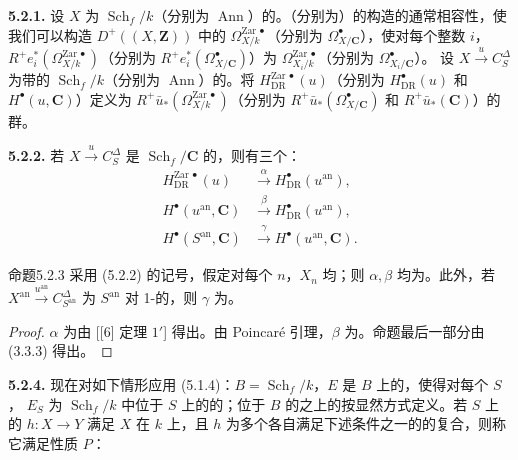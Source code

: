 \textbf{5.2.1.} 设 $X$ 为 $\operatorname{Sch}_f/k$（分别为 $\operatorname{Ann}$）的。（分别为）的构造的通常相容性，使我们可以构造 $D^+((X,\mathbf Z))$ 中的 $\Omega_{X/k}^{\mathrm{Zar}\,\bullet}$（分别为 $\Omega_{X/\mathbf C}^\bullet$），使对每个整数 $i$，$R^+e_i^*(\Omega_{X/k}^{\mathrm{Zar}\,\bullet})$（分别为 $R^+e_i^*(\Omega_{X/\mathbf C}^\bullet)$）为 $\Omega_{X_i/k}^{\mathrm{Zar}\,\bullet}$（分别为 $\Omega_{X_i/\mathbf C}^\bullet$）。
设 $X\xrightarrow{u}C_S^\Delta$ 为带的 $\operatorname{Sch}_f/k$（分别为 $\operatorname{Ann}$）的。将 $H_{\mathrm{DR}}^{\mathrm{Zar}\,\bullet}(u)$（分别为 $H_{\mathrm{DR}}^\bullet(u)$ 和 $H^\bullet(u,\mathbf C)$）定义为 $R^+\bar u_*(\Omega_{X/k}^{\mathrm{Zar}\,\bullet})$（分别为 $R^+\bar u_*(\Omega_{X/\mathbf C}^\bullet)$ 和 $R^+\bar u_*(\mathbf C)$）的群。

\textbf{5.2.2.} 若 $X\xrightarrow{u}C_S^\Delta$ 是 $\operatorname{Sch}_f/\mathbf C$ 的，则有三个：
\[
\begin{aligned}
H_{\mathrm{DR}}^{\mathrm{Zar}\,\bullet}(u)&\xrightarrow{\alpha}H_{\mathrm{DR}}^\bullet(u^{\mathrm{an}}),\\
H^\bullet(u^{\mathrm{an}},\mathbf C)&\xrightarrow{\beta}H_{\mathrm{DR}}^\bullet(u^{\mathrm{an}}),\\
H^\bullet(S^{\mathrm{an}},\mathbf C)&\xrightarrow{\gamma}H^\bullet(u^{\mathrm{an}},\mathbf C).
\end{aligned}
\]
\begin{SGAresult}{命题}{5.2.3}
采用 (5.2.2) 的记号，假定对每个 $n$，$X_n$ 均；则 $\alpha,\beta$ 均为。此外，若 $X^{\mathrm{an}}\xrightarrow{u^{\mathrm{an}}}C_{S^{\mathrm{an}}}^\Delta$ 为 $S^{\mathrm{an}}$ 对 1-的，则 $\gamma$ 为。
\end{SGAresult}
\begin{proof}
$\alpha$ 为由 [[6] 定理 $1'$] 得出。由 Poincaré 引理，$\beta$ 为。命题最后一部分由 (3.3.3) 得出。
\end{proof}
\textbf{5.2.4.} 现在对如下情形应用 (5.1.4)：$B=\operatorname{Sch}_f/k$，$E$ 是 $B$ 上的，使得对每个 $S$， $E_S$ 为 $\operatorname{Sch}_f/k$ 中位于 $S$ 上的的；位于 $B$ 的之上的按显然方式定义。若 $S$ 上的 $h:X\to Y$ 满足 $X$ 在 $k$ 上，且 $h$ 为多个各自满足下述条件之一的的复合，则称它满足性质 $P$：

